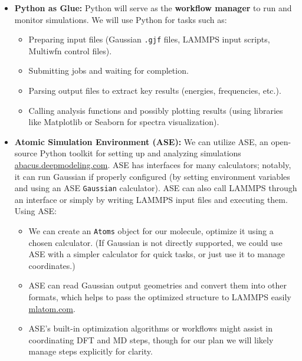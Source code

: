 \documentclass[11pt]{article}
\begin{document}
\begin{itemize}
  \item \textbf{Python as Glue:} Python will serve as the \textbf{workflow manager} to run and monitor simulations. We will use Python for tasks such as:
  \begin{itemize}
    \item Preparing input files (Gaussian \texttt{.gjf} files, LAMMPS input scripts, Multiwfn control files).
    \item Submitting jobs and waiting for completion.
    \item Parsing output files to extract key results (energies, frequencies, etc.).
    \item Calling analysis functions and possibly plotting results (using libraries like Matplotlib or Seaborn for spectra visualization).
  \end{itemize}
  \item \textbf{Atomic Simulation Environment (ASE):} We can utilize ASE, an open-source Python toolkit for setting up and analyzing simulations\,\href{https://abacus.deepmodeling.com}{abacus.deepmodeling.com}. ASE has interfaces for many calculators; notably, it can run Gaussian if properly configured (by setting environment variables and using an ASE \texttt{Gaussian} calculator). ASE can also call LAMMPS through an interface or simply by writing LAMMPS input files and executing them. Using ASE:
  \begin{itemize}
    \item We can create an \texttt{Atoms} object for our molecule, optimize it using a chosen calculator. (If Gaussian is not directly supported, we could use ASE with a simpler calculator for quick tasks, or just use it to manage coordinates.)
    \item ASE can read Gaussian output geometries and convert them into other formats, which helps to pass the optimized structure to LAMMPS easily\,\href{https://mlatom.com}{mlatom.com}.
    \item ASE’s built-in optimization algorithms or workflows might assist in coordinating DFT and MD steps, though for our plan we will likely manage steps explicitly for clarity.
  \end{itemize}

\end{itemize}
\end{document}
